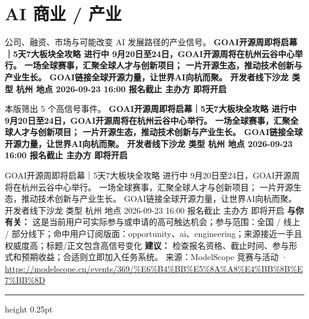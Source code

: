 \documentclass[10.5pt]{ctexart}
\begin{document}
\section*{AI 商业 / 产业}
{\color{ormuted} 公司、融资、市场与可能改变 AI 发展路径的产业信号。}
\vspace{2mm}
{\LARGE\bfseries GOAI开源周即将启幕｜5天7大板块全攻略 进行中 9月20日至24日，GOAI开源周将在杭州云谷中心举行。 一场全球赛事，汇聚全球人才与创新项目； 一片开源生态，推动技术创新与产业生长。 GOAI链接全球开源力量，让世界AI向杭而聚。 开发者线下沙龙 类型 杭州 地点 2026-09-23 16:00 报名截止 主办方 即将开启}\par
\vspace{1mm}
{\color{ormuted} 本版筛出 5 个高信号事件。}
\vspace{3mm}
{\Large\bfseries GOAI开源周即将启幕｜5天7大板块全攻略 进行中 9月20日至24日，GOAI开源周将在杭州云谷中心举行。 一场全球赛事，汇聚全球人才与创新项目； 一片开源生态，推动技术创新与产业生长。 GOAI链接全球开源力量，让世界AI向杭而聚。 开发者线下沙龙 类型 杭州 地点 2026-09-23 16:00 报名截止 主办方 即将开启}\par
GOAI开源周即将启幕｜5天7大板块全攻略 进行中 9月20日至24日，GOAI开源周将在杭州云谷中心举行。 一场全球赛事，汇聚全球人才与创新项目； 一片开源生态，推动技术创新与产业生长。 GOAI链接全球开源力量，让世界AI向杭而聚。 开发者线下沙龙 类型 杭州 地点 2026-09-23 16:00 报名截止 主办方 即将开启
\textbf{与你有关：} 这是当前用户可实际参与或申请的高可触达机会；参与范围：全国 / 线上 / 部分线下；命中用户订阅版面：opportunity、ai、engineering；来源接近一手且权威度高；标题/正文包含高信号变化
\textbf{建议：} 检查报名资格、截止时间、参与形式和预期收益；合适则立即加入任务系统。
{\footnotesize\color{ormuted} 来源：ModelScope 竞赛与活动 · \url{https://modelscope.cn/events/369/%E6%B4%BB%E5%8A%A8%E4%BB%8B%E7%BB%8D}}
\vspace{4mm}
\hrule height 0.25pt
\vspace{3mm}
\end{document}
